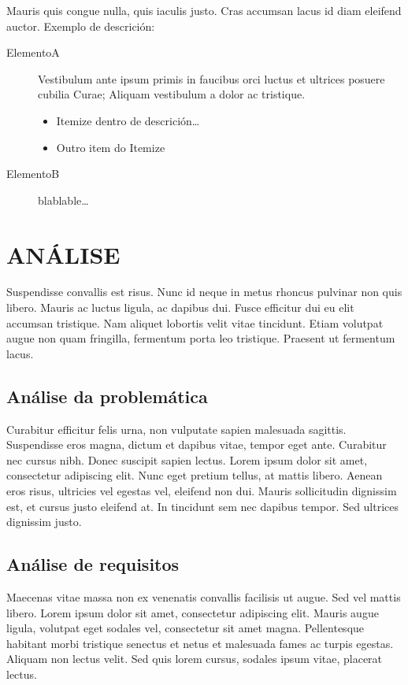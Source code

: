 \documentclass{pfc}
\begin{document}
Mauris quis congue nulla, quis iaculis justo. Cras accumsan
lacus id diam eleifend auctor. Exemplo de descrición:
\begin{description}
\item[ElementoA] Vestibulum ante ipsum primis in faucibus orci luctus
  et ultrices posuere cubilia Curae; Aliquam vestibulum a dolor ac
  tristique.
  \begin{itemize}
  \item Itemize dentro de descrición\ldots
  \item Outro item do Itemize
  \end{itemize}
\item[ElementoB] blablable\ldots
\end{description}



\chapter{ANÁLISE}
\label{chap:anal}

Suspendisse convallis est risus. Nunc id neque in metus rhoncus
pulvinar non quis libero. Mauris ac luctus ligula, ac dapibus
dui. Fusce efficitur dui eu elit accumsan tristique. Nam aliquet
lobortis velit vitae tincidunt. Etiam volutpat augue non quam
fringilla, fermentum porta leo tristique. Praesent ut fermentum lacus.


\section{Análise da problemática}

Curabitur efficitur felis urna, non vulputate sapien malesuada
sagittis. Suspendisse eros magna, dictum et dapibus vitae, tempor eget
ante. Curabitur nec cursus nibh. Donec suscipit sapien lectus. Lorem
ipsum dolor sit amet, consectetur adipiscing elit. Nunc eget pretium
tellus, at mattis libero. Aenean eros risus, ultricies vel egestas
vel, eleifend non dui. Mauris sollicitudin dignissim est, et cursus
justo eleifend at. In tincidunt sem nec dapibus tempor. Sed ultrices
dignissim justo.


\section{Análise de requisitos}

Maecenas vitae massa non ex venenatis convallis facilisis ut
augue. Sed vel mattis libero. Lorem ipsum dolor sit amet, consectetur
adipiscing elit. Mauris augue ligula, volutpat eget sodales vel,
consectetur sit amet magna. Pellentesque habitant morbi tristique
senectus et netus et malesuada fames ac turpis egestas. Aliquam non
lectus velit. Sed quis lorem cursus, sodales ipsum vitae, placerat
lectus.
\end{document}
